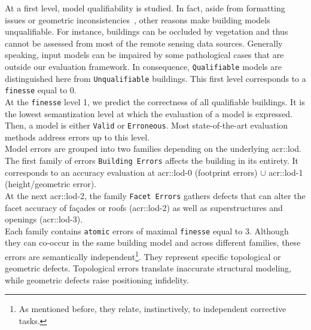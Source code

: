         At a first level, model qualifiability is studied.
        In fact, aside from formatting issues or geometric inconsistencies~\parencite{ledoux2018val3dity}, other reasons make building models unqualifiable.
        For instance, buildings can be occluded by vegetation and thus cannot be assessed from most of the remote sensing data sources.
        Generally speaking, input models can be impaired by some pathological cases that are outside our evaluation framework.
        In consequence, \texttt{Qualifiable} models are distinguished here from \texttt{Unqualifiable} buildings.
        This first level corresponds to a \texttt{finesse} equal to 0.\\
        At the \texttt{finesse} level 1, we predict the correctness of all qualifiable buildings.
        It is the lowest semantization level at which the evaluation of a model is expressed.
        Then, a model is either \texttt{Valid} or \texttt{Erroneous}.
        Most state-of-the-art evaluation methods address errors up to this level.\\
        Model errors are grouped into two families depending on the underlying \gls{acr::lod}.
        The first family of errors \texttt{Building Errors} affects the building in its entirety.
        It corresponds to an accuracy evaluation at \gls{acr::lod}-0 (footprint errors) $\cup$ \gls{acr::lod}-1 (height/geometric error).\\
        At the next \gls{acr::lod}-2, the family \texttt{Facet Errors} gathers defects that can alter the facet accuracy of fa\c{c}ades or roofs (\gls{acr::lod}-2) as well as superstructures and openings (\gls{acr::lod}-3).\\
        Each family contains \texttt{atomic} errors of maximal \texttt{finesse} equal to 3.
        Although they can co-occur in the same building model and across different families, these errors are semantically independent\footnote{As mentioned before, they relate, instinctively, to independent corrective tasks.}.
        They represent specific topological or geometric defects.
        Topological errors translate inaccurate structural modeling, while geometric defects raise positioning infidelity.\\

